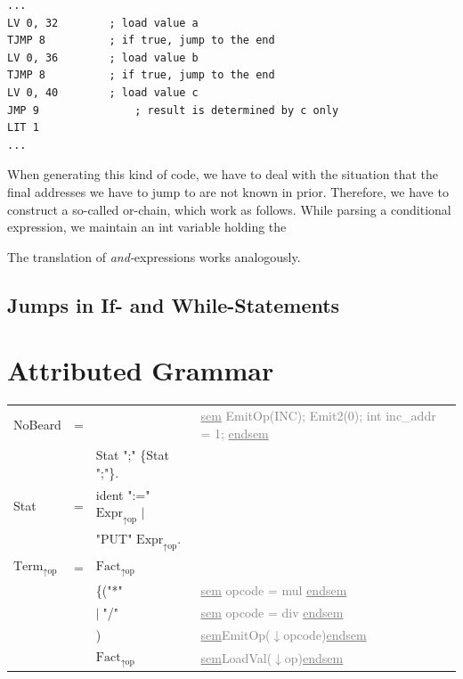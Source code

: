 \documentclass[11pt]{report}
\newcommand{\leongage}{NoBeard}
\newcommand{\alternative}{$\mid \;$}
\newenvironment{atg}[1][6cm]
	{\begin{tabular}[b]{lclp{#1}}}
	{\end{tabular}}
\newcommand{\atgsy}[2]{$\textrm{#1}_\textrm{#2}$}
\newcommand{\outattr}{$\uparrow$}
\newcommand{\inattr}{$\downarrow$}
\newcommand{\semantics}[1]{\textcolor{Gray}{#1}}
\newenvironment {sem}
	{\underline{sem}}
	{\underline{endsem}}
\begin{document}

\begin{lstlisting}[float,caption={Assembler code of or-chain}, captionpos=b,label=cod:orchain]
...
LV 0, 32		; load value a
TJMP 8			; if true, jump to the end
LV 0, 36		; load value b
TJMP 8			; if true, jump to the end
LV 0, 40		; load value c
JMP 9				; result is determined by c only
LIT 1
...
\end{lstlisting}
When generating this kind of code, we have to deal with the situation that the final addresses we have to jump to are not known in prior. Therefore, we have to construct a so-called or-chain, which work as follows. While parsing a conditional expression, we maintain an int variable holding the 

The translation of {\em and-}expressions works analogously.

\section{Jumps in If- and While-Statements}

\chapter{Attributed Grammar}
\begin{atg}[4.5cm]
\leongage &=& & \semantics{\begin{sem} \newline EmitOp(INC); \newline Emit2(0); \newline int inc\_addr = 1; \newline \end{sem}}\\
&&Stat ";" \{Stat ";"\}. \\

Stat & = & ident ":=" \atgsy{Expr}{\outattr op}  \alternative \\
&& "PUT" \atgsy{Expr}{\outattr op}. \\

\atgsy{Term}{\outattr op} &=& \atgsy{Fact}{\outattr op}  \\
&& \{("*" &\semantics{\begin{sem} opcode = mul \end{sem}}\\
&& \alternative "/" & \semantics{\begin{sem} opcode = div \end{sem}}\\
&&) & \semantics{\begin{sem}EmitOp(\inattr opcode)\end{sem}}\\
&&\atgsy{Fact}{\outattr op} & \semantics{\begin{sem}LoadVal(\inattr op)\end{sem}}
\end{atg}

{}

\end{document}
